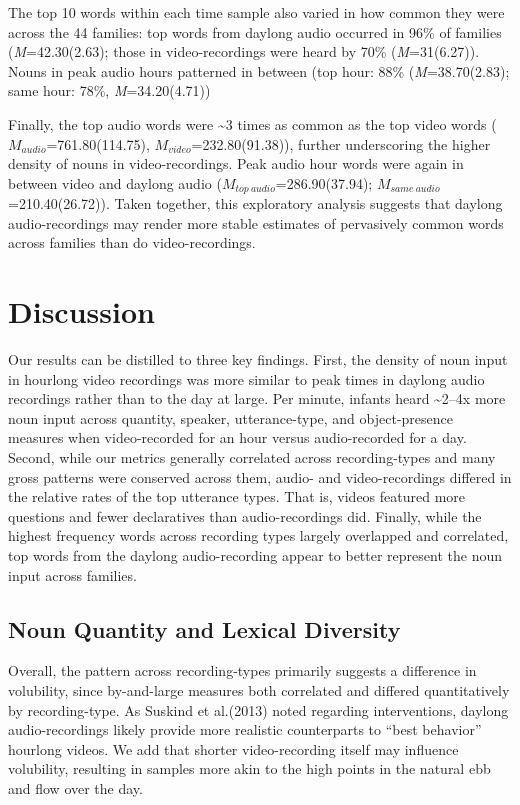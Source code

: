 \documentclass[man]{apa6}
\theoremstyle{definition}
\theoremstyle{definition}
\theoremstyle{definition}
\theoremstyle{remark}
\begin{document}
The top 10 words within each time sample also varied in how common they
were across the 44 families: top words from daylong audio occurred in
96\% of families (\emph{M}=42.30(2.63); those in video-recordings were
heard by 70\% (\emph{M}=31(6.27)). Nouns in peak audio hours patterned
in between (top hour: 88\% (\emph{M}=38.70(2.83); same hour: 78\%,
\emph{M}=34.20(4.71))

Finally, the top audio words were \textasciitilde{}3 times as common as
the top video words (\(M_{audio}\)=761.80(114.75),
\(M_{video}\)=232.80(91.38)), further underscoring the higher density of
nouns in video-recordings. Peak audio hour words were again in between
video and daylong audio (\(M_{top\ audio}\)=286.90(37.94);
\(M_{same\ audio}\)=210.40(26.72)). Taken together, this exploratory
analysis suggests that daylong audio-recordings may render more stable
estimates of pervasively common words across families than do
video-recordings.

\section{Discussion}\label{discussion}

Our results can be distilled to three key findings. First, the density
of noun input in hourlong video recordings was more similar to peak
times in daylong audio recordings rather than to the day at large. Per
minute, infants heard \textasciitilde{}2--4x more noun input across
quantity, speaker, utterance-type, and object-presence measures when
video-recorded for an hour versus audio-recorded for a day. Second,
while our metrics generally correlated across recording-types and many
gross patterns were conserved across them, audio- and video-recordings
differed in the relative rates of the top utterance types. That is,
videos featured more questions and fewer declaratives than
audio-recordings did. Finally, while the highest frequency words across
recording types largely overlapped and correlated, top words from the
daylong audio-recording appear to better represent the noun input across
families.

\subsection{Noun Quantity and Lexical
Diversity}\label{noun-quantity-and-lexical-diversity}

Overall, the pattern across recording-types primarily suggests a
difference in volubility, since by-and-large measures both correlated
and differed quantitatively by recording-type. As Suskind et al.(2013)
noted regarding interventions, daylong audio-recordings likely provide
more realistic counterparts to \enquote{best behavior} hourlong videos.
We add that shorter video-recording itself may influence volubility,
resulting in samples more akin to the high points in the natural ebb and
flow over the day.
\end{document}
